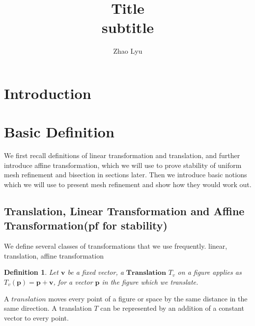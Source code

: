 \documentclass{article}
\title{\textbf{Title} \\subtitle}
\author{Zhao Lyu}
\newtheorem*{definition*}{Definition}
\begin{document}
  \doublespacing %
  \maketitle
  \singlespacing

  \newpage %
  \tableofcontents
  \newpage

  \section{Introduction}
  \newpage

  \section{Basic Definition}
    We first recall definitions of linear transformation and translation, and further introduce affine transformation, which we will use to prove stability of uniform mesh refinement and bisection in sections later. Then we introduce basic notions which we will use to present mesh refinement and show how they would work out.

    \subsection{Translation, Linear Transformation and Affine Transformation(pf for stability)}
      
      We define several classes of transformations that we use frequently.
      linear, translation, affine transformation\\
      
      \begin{definition*}
         Let $\textbf{v}$ be a fixed vector, a $\textbf{Translation}$ ${T}_v$ on a figure applies as ${T}_v (\textbf{p}) = \textbf{p} + \textbf{v}$, for a vector $\textbf{p}$ in the figure which we translate.
      \end{definition*}
      A $\textit{translation}$ moves every point of a figure or space by the same distance in the same direction. A translation ${T}$ can be represented by an addition of a constant vector to every point.\\
\end{document}
